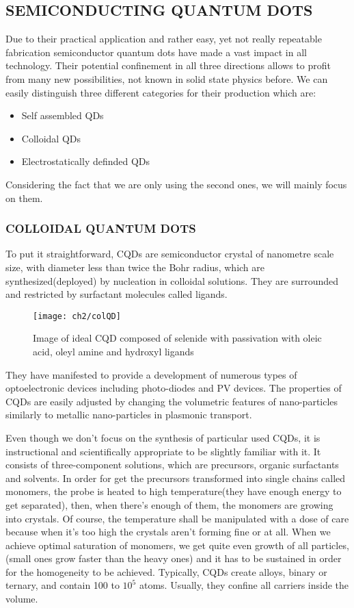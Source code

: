 \subsection{SEMICONDUCTING QUANTUM DOTS}

Due to their practical application and rather easy, yet not really repeatable fabrication semiconductor quantum dots have made a vast impact in all technology. Their potential confinement in all three directions allows to profit from many new possibilities, not known in solid state physics before.
We can easily distinguish three different categories for their production which are:
\begin{itemize}
\item Self assembled QDs
\item Colloidal QDs
\item Electrostatically definded QDs 
\end{itemize}
Considering the fact that we are only using the second ones, we will mainly focus on them. 

\subsubsection{COLLOIDAL QUANTUM DOTS}
To put it straightforward, CQDs are semiconductor crystal of nanometre scale size, with diameter less than twice the Bohr radius, which are synthesized(deployed) by nucleation in colloidal solutions. They are surrounded and restricted by surfactant molecules called ligands. 

\begin{figure}[H]
\centering
\texttt{[image: ch2/colQD]}

\caption{Image of ideal CQD composed of selenide with passivation with oleic acid, oleyl amine and hydroxyl ligands \cite{qd}}
\end{figure}

\noindent They have manifested to provide a development of numerous types of optoelectronic devices including photo-diodes and PV devices. The properties of CQDs are easily adjusted by changing the volumetric features of nano-particles similarly to metallic nano-particles in plasmonic transport. \cite{Abdelhady2015} \cite{G.D.Scholes2003}

\noindent Even though we don't focus on the synthesis of particular used CQDs, it is instructional and scientifically appropriate to be slightly familiar with it. It consists of three-component solutions, which are precursors, organic surfactants and solvents. In order for get the precursors transformed into single chains called monomers, the probe is heated to high temperature(they have enough energy to get separated), then, when there's enough of them, the monomers are growing into crystals. Of course, the temperature shall be manipulated with a dose of care because when it's too high the crystals aren't forming fine or at all. When we achieve optimal saturation of monomers, we get quite even growth of all particles, (small ones grow faster than the heavy ones) and it has to be sustained in order for the homogeneity to be achieved.
Typically, CQDs create alloys, binary or ternary, and contain 100 to $10^5$ atoms. Usually, they confine all carriers inside the volume.
